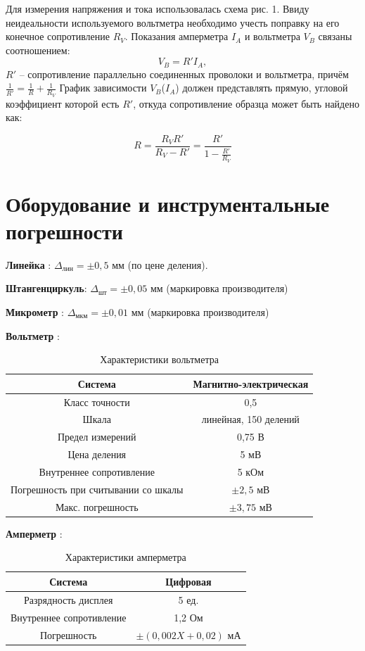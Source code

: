 \documentclass[a4paper,12pt]{article} %
\begin{document}
Для измерения напряжения и тока использовалась схема рис. 1.
Ввиду неидеальности используемого вольтметра необходимо 
учесть поправку на его конечное сопротивление $R_V$. Показания амперметра $I_A$ и вольтметра $V_B$ связаны соотношением:
\begin{equation}
V_B=R'I_A,
\end{equation}
 $R'$ -- сопротивление параллельно соединенных проволоки и 
вольтметра, причём $\frac{1}{R'}=\frac{1}{R}+\frac{1}{R_V}$
График зависимости $V_B$($I_A$) должен представлять прямую, угловой коэффициент которой есть $R'$, откуда сопротивление образца может быть найдено как:

\begin{equation}
    R = \frac{R_VR'}{R_V-R'} = \frac{R'}{1-\frac{R'}{R_V}}
\end{equation}

\section{Оборудование и инструментальные погрешности}
\tab\textbf{Линейка} : $\Delta_{\text{лин}} = \pm 0,5$ мм (по цене деления). 

\textbf{Штангенциркуль}: $\Delta_{\text{шт}} = \pm 0,05$ мм (маркировка производителя)

\textbf{Микрометр} : $\Delta_{\text{мкм}} = \pm 0,01$ мм (маркировка производителя)

\textbf{Вольтметр} :
\begin{table}[h]
\centering
\caption{Характеристики вольтметра}
\begin{tabular}{|c|c|}
\hline 
Система & Магнитно-электрическая \\ 
\hline 
Класс точности & 0,5 \\ 
\hline 
Шкала & линейная, 150 делений  \\ 
\hline 
Предел измерений & 0,75 В \\ 
\hline 
Цена деления & 5 мВ \\ 
\hline 
Внутреннее сопротивление & 5 кОм \\ 
\hline 
Погрешность при считывании со шкалы & $\pm 2,5$ мВ \\ 
\hline 
Макс. погрешность & $\pm3,75$ мВ \\ 
\hline 
\end{tabular} 
\end{table}

\textbf{Амперметр} :
\begin{table}[h]
\centering
\caption{Характеристики амперметра}
\begin{tabular}{|c|c|}
\hline 
Система & Цифровая \\  
\hline 
Разрядность дисплея & 5 ед. \\ 
\hline 
Внутреннее сопротивление & 1,2 Ом \\ 
\hline 
Погрешность & $\pm (0,002X+0,02)$ мА \\ 
\hline 
\end{tabular} 
\end{table}
\end{document}

